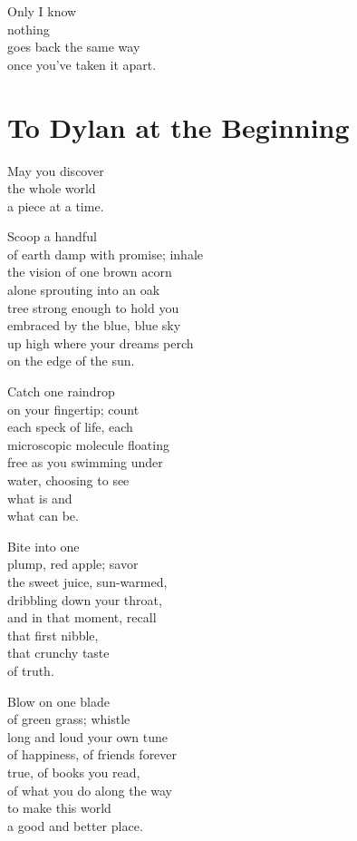 \documentclass[twoside,10pt]{book}
\begin{document}
Only I know\\
nothing\\
goes back the same way\\
once you've taken it apart.


\clearpage
\section{To Dylan at the Beginning}

May you discover\\
the whole world\\
a piece at a time.

Scoop a handful\\
of earth damp with promise; inhale\\
the vision of one brown acorn\\
alone sprouting into an oak\\
tree strong enough to hold you\\
embraced by the blue, blue sky\\
up high where your dreams perch\\
on the edge of the sun.

Catch one raindrop\\
on your fingertip; count\\
each speck of life, each\\
microscopic molecule floating\\
free as you swimming under\\
water, choosing to see\\
what is and\\
what can be.

Bite into one\\
plump, red apple; savor\\
the sweet juice, sun-warmed,\\
dribbling down your throat,\\
and in that moment, recall\\
that first nibble,\\
that crunchy taste\\
of truth.

Blow on one blade\\
of green grass; whistle\\
long and loud your own tune\\
\clearpage
of happiness, of friends forever\\
true, of books you read,\\
of what you do along the way\\
to make this world\\
a good and better place.
\end{document}
